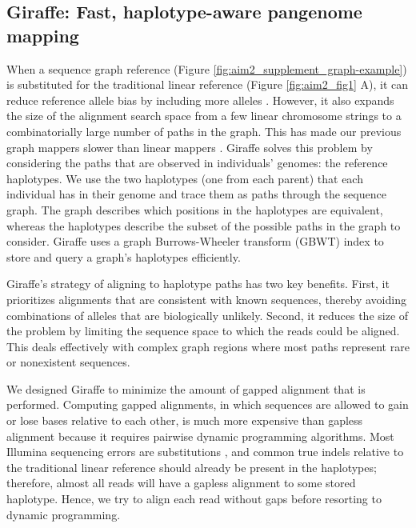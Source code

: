 \documentclass[11pt]{ucscthesis}
\begin{document}
\subsection{Giraffe: Fast, haplotype-aware pangenome mapping}
When a sequence graph reference \cite{noauthor_computational_2016} (Figure \ref{fig:aim2_supplement_graph-example}) is substituted for the traditional linear reference (Figure \ref{fig:aim2_fig1} A), it can reduce reference allele bias by including more alleles \cite{garrison_vg_2018}. 
However, it also expands the size of the alignment search space from a few linear chromosome strings to a combinatorially large number of paths in the graph.
This has made our previous graph mappers slower than linear mappers \cite{garrison_vg_2018}.
Giraffe solves this problem by considering the paths that are observed in individuals’ genomes: the reference haplotypes.
We use the two haplotypes (one from each parent) that each individual has in their genome and trace them as paths through the sequence graph.
The graph describes which positions in the haplotypes are equivalent, whereas the haplotypes describe the subset of the possible paths in the graph to consider.
Giraffe uses a graph Burrows-Wheeler transform (GBWT) index \cite{siren_indexes_2020} to store and query a graph’s haplotypes efficiently.

Giraffe’s strategy of aligning to haplotype paths has two key benefits.
First, it prioritizes alignments that are consistent with known sequences, thereby avoiding combinations of alleles that are biologically unlikely.
Second, it reduces the size of the problem by limiting the sequence space to which the reads could be aligned.
This deals effectively with complex graph regions where most paths represent rare or nonexistent sequences.

We designed Giraffe to minimize the amount of gapped alignment that is performed.
Computing gapped alignments, in which sequences are allowed to gain or lose bases relative to each other, is much more expensive than gapless alignment because it requires pairwise dynamic programming algorithms.
Most Illumina sequencing errors are substitutions \cite{schirmer2016illumina}, and common true indels relative to the traditional linear reference should already be present in the haplotypes; therefore, almost all reads will have a gapless alignment to some stored haplotype.
Hence, we try to align each read without gaps before resorting to dynamic programming.
\end{document}
